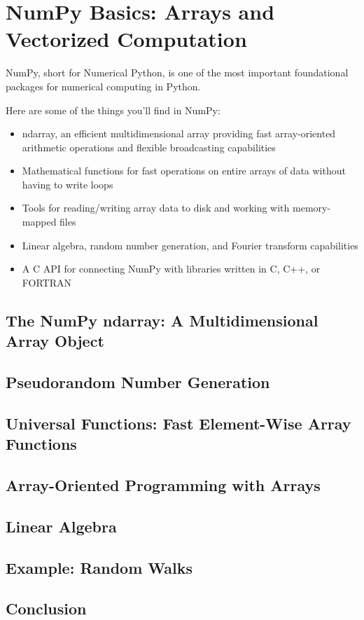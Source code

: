 \chapter{NumPy Basics: Arrays and Vectorized Computation}
NumPy, short for Numerical Python, is one of the most important foundational packages for numerical computing in Python. 

Here are some of the things you’ll find in NumPy:
\begin{itemize}
    \item ndarray, an efficient multidimensional array providing fast array-oriented arithmetic operations and flexible broadcasting capabilities
    \item Mathematical functions for fast operations on entire arrays of data without having to write loops
    \item Tools for reading/writing array data to disk and working with memory-mapped files
    \item Linear algebra, random number generation, and Fourier transform capabilities
    \item A C API for connecting NumPy with libraries written in C, C++, or FORTRAN
\end{itemize}
\section{The NumPy ndarray: A Multidimensional Array Object}
\section{Pseudorandom Number Generation}
\section{Universal Functions: Fast Element-Wise Array Functions}
\section{Array-Oriented Programming with Arrays}
\section{Linear Algebra}
\section{Example: Random Walks}
\section{Conclusion}